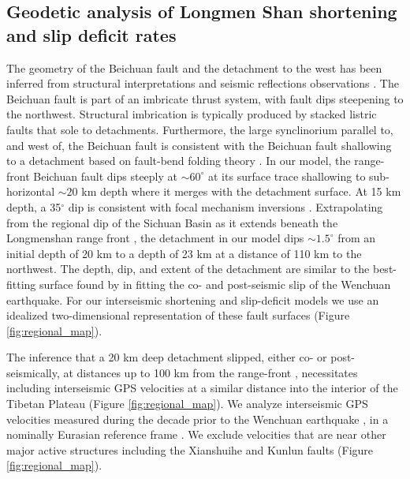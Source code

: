 \documentclass[draft,jgrga]{agutex}
\begin{document}
\begin{article}
\section{Geodetic analysis of Longmen Shan shortening and slip deficit rates}
The geometry of the Beichuan fault and the detachment to the west has been inferred from structural interpretations \citep{Hubbard2010} and seismic reflections observations \citep{Zhang2009, Guo2013}. The Beichuan fault is part of an imbricate thrust system, with fault dips steepening to the northwest. Structural imbrication is typically produced by stacked listric faults that sole to detachments. Furthermore, the large synclinorium parallel to, and west of, the Beichuan fault is consistent with the Beichuan fault shallowing to a detachment based on fault-bend folding theory \citep{Hubbard2010, Suppe1983}. In our model, the range-front Beichuan fault dips steeply at ${\sim}60^{\circ}$ at its surface trace shallowing to sub-horizontal ${\sim}20$ km depth where it merges with the detachment surface. At 15 km depth, a 35$^{\circ}$ dip is consistent with focal mechanism inversions \citep{Hubbard2010}. Extrapolating from the regional dip of the Sichuan Basin as it extends beneath the Longmenshan range front \citep{Hubbard2010, Guo2013}, the detachment in our model dips ${\sim}1.5^{\circ}$ from an initial depth of 20 km to a depth of 23 km at a distance of 110 km to the northwest. The depth, dip, and extent of the detachment are similar to the best-fitting surface found by \citet{Qi2011} in fitting the co- and post-seismic slip of the Wenchuan earthquake. For our interseismic shortening and slip-deficit models we use an idealized two-dimensional representation of these fault surfaces (Figure \ref{fig:regional_map}).

The inference that a 20 km deep detachment slipped, either co- or post-seismically, at distances up to 100 km from the range-front \citep{Qi2011}, necessitates including interseismic GPS velocities at a similar distance into the interior of the Tibetan Plateau (Figure \ref{fig:regional_map}). We analyze interseismic GPS velocities measured during the decade prior to the Wenchuan earthquake \citep{gan07}, in a nominally Eurasian reference frame \citep{apel06}. We exclude velocities that are near other major active structures including the Xianshuihe and Kunlun faults (Figure \ref{fig:regional_map}). 


\end{article}
\end{document}

